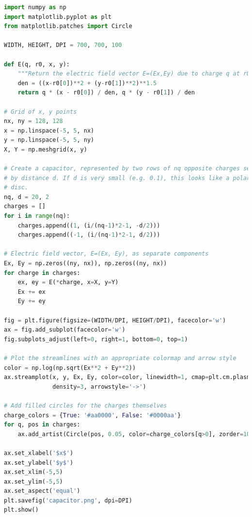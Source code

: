 \begin{lstlisting}[language=Python, frame=lines,basicstyle=\footnotesize, caption={Linhas de campo de um capacitor de placas paralelas.}, label={lst:Capacitor}]
import numpy as np
import matplotlib.pyplot as plt
from matplotlib.patches import Circle

WIDTH, HEIGHT, DPI = 700, 700, 100

def E(q, r0, x, y):
    """Return the electric field vector E=(Ex,Ey) due to charge q at r0."""
    den = ((x-r0[0])**2 + (y-r0[1])**2)**1.5
    return q * (x - r0[0]) / den, q * (y - r0[1]) / den

# Grid of x, y points
nx, ny = 128, 128
x = np.linspace(-5, 5, nx)
y = np.linspace(-5, 5, ny)
X, Y = np.meshgrid(x, y)

# Create a capacitor, represented by two rows of nq opposite charges separated
# by distance d. If d is very small (e.g. 0.1), this looks like a polarized
# disc.
nq, d = 20, 2
charges = []
for i in range(nq):
    charges.append((1, (i/(nq-1)*2-1, -d/2)))
    charges.append((-1, (i/(nq-1)*2-1, d/2)))

# Electric field vector, E=(Ex, Ey), as separate components
Ex, Ey = np.zeros((ny, nx)), np.zeros((ny, nx))
for charge in charges:
    ex, ey = E(*charge, x=X, y=Y)
    Ex += ex
    Ey += ey

fig = plt.figure(figsize=(WIDTH/DPI, HEIGHT/DPI), facecolor='w')
ax = fig.add_subplot(facecolor='w')
fig.subplots_adjust(left=0, right=1, bottom=0, top=1)

# Plot the streamlines with an appropriate colormap and arrow style
color = np.log(np.sqrt(Ex**2 + Ey**2))
ax.streamplot(x, y, Ex, Ey, color=color, linewidth=1, cmap=plt.cm.plasma,
              density=3, arrowstyle='->')

# Add filled circles for the charges themselves
charge_colors = {True: '#aa0000', False: '#0000aa'}
for q, pos in charges:
    ax.add_artist(Circle(pos, 0.05, color=charge_colors[q>0], zorder=10))

ax.set_xlabel('$x$')
ax.set_ylabel('$y$')
ax.set_xlim(-5,5)
ax.set_ylim(-5,5)
ax.set_aspect('equal')
plt.savefig('capacitor.png', dpi=DPI)
plt.show()
\end{lstlisting}

